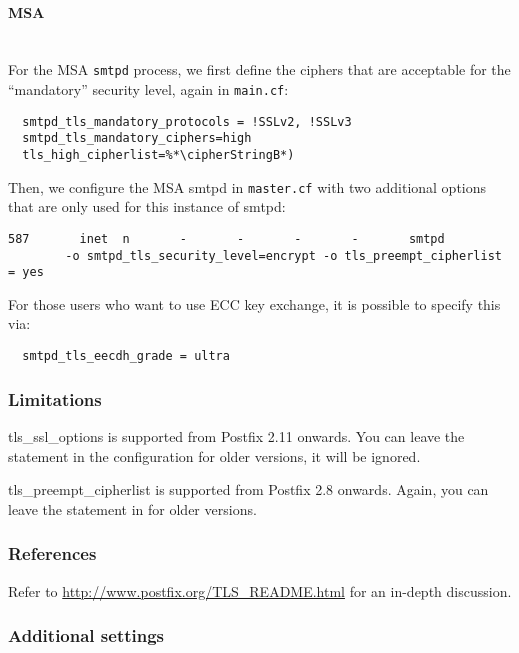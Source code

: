 \paragraph*{MSA}\mbox{}\\

For the MSA \verb|smtpd| process, we first define the ciphers that are
acceptable for the ``mandatory'' security level, again in
\verb|main.cf|:

\begin{lstlisting}
  smtpd_tls_mandatory_protocols = !SSLv2, !SSLv3
  smtpd_tls_mandatory_ciphers=high
  tls_high_cipherlist=%*\cipherStringB*)
\end{lstlisting}

Then, we configure the MSA smtpd in \verb|master.cf| with two
additional options that are only used for this instance of smtpd:

\begin{lstlisting}
587       inet  n       -       -       -       -       smtpd 
        -o smtpd_tls_security_level=encrypt -o tls_preempt_cipherlist = yes
\end{lstlisting}

For those users who want to use ECC key exchange, it is possible to specify this via:
\begin{lstlisting}
  smtpd_tls_eecdh_grade = ultra
\end{lstlisting}

\subsubsection{Limitations}

tls\_ssl\_options is supported from Postfix 2.11 onwards. You can
leave the statement in the configuration for older versions, it will
be ignored.

tls\_preempt\_cipherlist is supported from Postfix 2.8 onwards. Again,
you can leave the statement in for older versions.

\subsubsection{References}

Refer to \url{http://www.postfix.org/TLS_README.html} for an in-depth
discussion.

\subsubsection{Additional settings}

